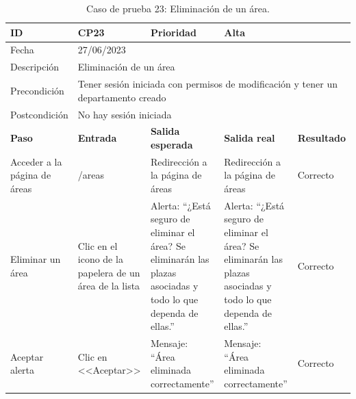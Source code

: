 \begin{table}[H]
\begin{tabular}{p{} p{} p{} p{} p{}}
\cellcolor{gray!25}
ID   & CP23 & \cellcolor{gray!25} Prioridad   & Alta \\ \hline
\cellcolor{gray!25} Fecha	&	\multicolumn{4}{l}{27/06/2023} \\ \hline
\cellcolor{gray!25} Descripción		&	\multicolumn{4}{l}{Eliminación de un área} \\ \hline                                            
\cellcolor{gray!25}
Precondición  & \multicolumn{4}{p{.66\textwidth}}{Tener sesión iniciada con permisos de modificación y tener un departamento creado} \\ \hline
\cellcolor{gray!25} Postcondición & \multicolumn{4}{l}{No hay sesión iniciada}                                                    \\ \hline
\rowcolor{gray!25}
\textbf{Paso}   & \textbf{Entrada} & \textbf{Salida esperada} & \textbf{Salida real} & \textbf{Resultado} \\ \hline
Acceder a la página de áreas
& /areas                                                                          
& Redirección a la página de áreas                                  
& Redirección a la página de áreas                                   
& Correcto                            
\\ \hline
Eliminar un área
& Clic en el icono de la papelera de un área de la lista
& Alerta: ``¿Está seguro de eliminar el área? Se eliminarán las plazas asociadas y todo lo que dependa de ellas.''
& Alerta: ``¿Está seguro de eliminar el área? Se eliminarán las plazas asociadas y todo lo que dependa de ellas.''
& Correcto
\\ \hline
Aceptar alerta
& Clic en <<Aceptar>>
& Mensaje: ``Área eliminada correctamente'' 
& Mensaje: ``Área eliminada correctamente'' 
& Correcto
\\ \hline             
\end{tabular}
\caption{Caso de prueba 23: Eliminación de un área.}
\end{table}

